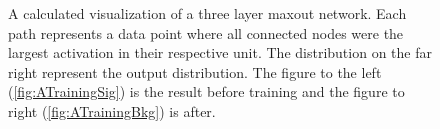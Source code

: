 \begin{figure}
{\begin{subfigure}{.6\textwidth}
        \caption{}
        \label{fig:ATraining}
    \end{subfigure}
    }
    \caption[A calculated visualization of the activation of a three layer maxout network, before and after training.]{
    A calculated visualization of a three layer maxout network. Each path 
    represents a data point where all connected nodes were the largest activation in their respective 
    unit. The distribution on the far right represent the output distribution. The figure to the left
    (\ref{fig:ATrainingSig}) is the result before training and the figure to right (\ref{fig:ATrainingBkg})
    is after.}
\end{figure}


\begin{figure}
\end{figure}
